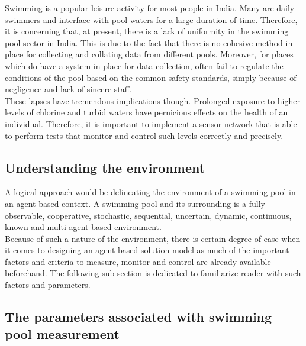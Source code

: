 \documentclass[12pt]{article}
\begin{document}
Swimming is a popular leisure activity for most people in India. Many are daily swimmers and interface with pool waters for a large duration of time. Therefore, it is concerning that, at present, there is a lack of uniformity in the swimming pool sector in India. This is due to the fact that there is no cohesive method in place for collecting and collating data from different pools. Moreover, for places which do have a system in place for data collection, often fail to regulate the conditions of the pool based on the common safety standards, simply because of negligence and lack of sincere staff.\\
These lapses have tremendous implications though. Prolonged exposure to higher levels of chlorine and turbid waters have pernicious effects on the health of an individual. Therefore, it is important to implement a sensor network that is able to perform tests that monitor and control such levels correctly and precisely.

\subsection{Understanding the environment}

A logical approach would be delineating the environment of a swimming pool in an agent-based context. A swimming pool and its surrounding is a fully-observable, cooperative, stochastic, sequential, uncertain, dynamic, continuous, known and multi-agent based environment.\\
Because of such a nature of the environment, there is certain degree of ease when it comes to designing an agent-based solution model as much of the important factors and criteria to measure, monitor and control are already available beforehand. The following sub-section is dedicated to familiarize reader with such factors and parameters.

\subsection{The parameters associated with swimming pool measurement}
\end{document}

